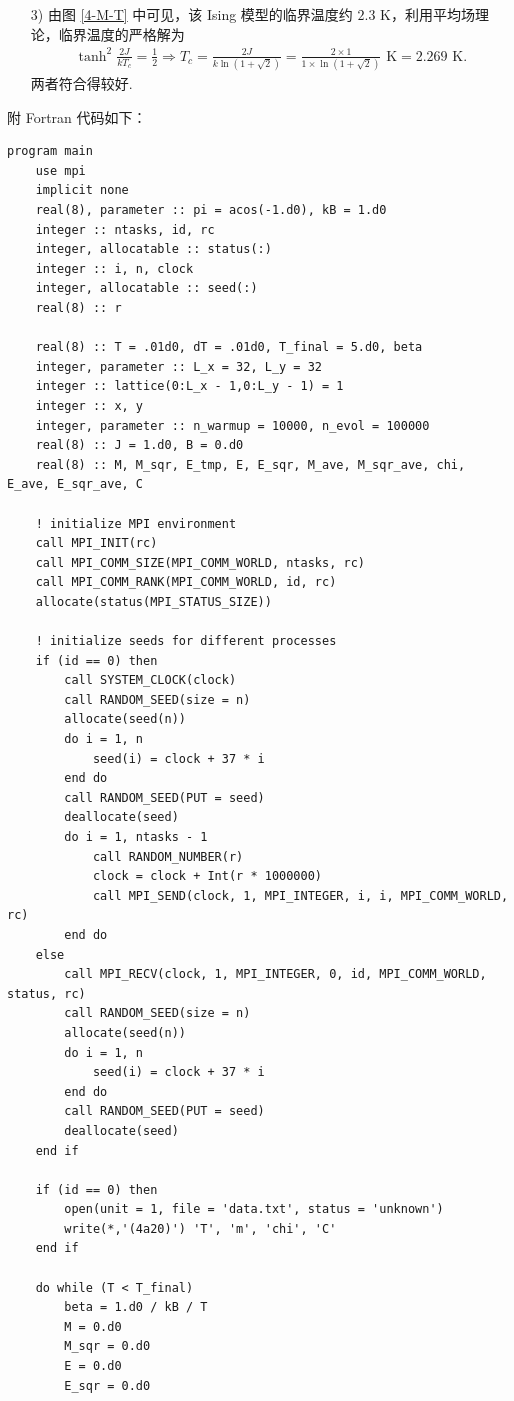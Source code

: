 \documentclass{assignment}
\begin{document}
\begin{sol}
\begin{itemize}
        \item[3)] 由图 \ref{4-M-T} 中可见，该 Ising 模型的临界温度约 $2.3$ K，利用平均场理论，临界温度的严格解为
        \begin{align}
            \tanh^2\frac{2J}{kT_c}=\frac{1}{2}\Longrightarrow T_c=\frac{2J}{k\ln(1+\sqrt{2})}=\frac{2\times 1}{1\times\ln(1+\sqrt{2})}\text{ K}=2.269\text{ K}.
        \end{align}
        两者符合得较好.
    \end{itemize}
    附 Fortran 代码如下：
    \begin{lstlisting}
program main
    use mpi
    implicit none
    real(8), parameter :: pi = acos(-1.d0), kB = 1.d0
    integer :: ntasks, id, rc
    integer, allocatable :: status(:)
    integer :: i, n, clock
    integer, allocatable :: seed(:)
    real(8) :: r

    real(8) :: T = .01d0, dT = .01d0, T_final = 5.d0, beta
    integer, parameter :: L_x = 32, L_y = 32
    integer :: lattice(0:L_x - 1,0:L_y - 1) = 1
    integer :: x, y
    integer, parameter :: n_warmup = 10000, n_evol = 100000
    real(8) :: J = 1.d0, B = 0.d0
    real(8) :: M, M_sqr, E_tmp, E, E_sqr, M_ave, M_sqr_ave, chi, E_ave, E_sqr_ave, C

    ! initialize MPI environment
    call MPI_INIT(rc)
    call MPI_COMM_SIZE(MPI_COMM_WORLD, ntasks, rc)
    call MPI_COMM_RANK(MPI_COMM_WORLD, id, rc)
    allocate(status(MPI_STATUS_SIZE))

    ! initialize seeds for different processes
    if (id == 0) then
        call SYSTEM_CLOCK(clock)
        call RANDOM_SEED(size = n)
        allocate(seed(n))
        do i = 1, n
            seed(i) = clock + 37 * i
        end do
        call RANDOM_SEED(PUT = seed)
        deallocate(seed)
        do i = 1, ntasks - 1
            call RANDOM_NUMBER(r)
            clock = clock + Int(r * 1000000)
            call MPI_SEND(clock, 1, MPI_INTEGER, i, i, MPI_COMM_WORLD, rc)
        end do
    else
        call MPI_RECV(clock, 1, MPI_INTEGER, 0, id, MPI_COMM_WORLD, status, rc)
        call RANDOM_SEED(size = n)
        allocate(seed(n))
        do i = 1, n
            seed(i) = clock + 37 * i
        end do
        call RANDOM_SEED(PUT = seed)
        deallocate(seed)
    end if

    if (id == 0) then
        open(unit = 1, file = 'data.txt', status = 'unknown')
        write(*,'(4a20)') 'T', 'm', 'chi', 'C'
    end if

    do while (T < T_final)
        beta = 1.d0 / kB / T
        M = 0.d0
        M_sqr = 0.d0
        E = 0.d0
        E_sqr = 0.d0


\end{lstlisting}
\end{sol}
\end{document}

